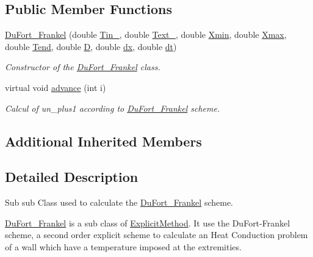 \subsection*{Public Member Functions}
\begin{DoxyCompactItemize}
\item 
\hyperlink{class_du_fort___frankel_a5076e52da09f994da1542d71a56781df}{Du\+Fort\+\_\+\+Frankel} (double \hyperlink{class_heat_conduction_a2487010bf67582643ff59c0c5167725e}{Tin\+\_}, double \hyperlink{class_heat_conduction_aeb50fb3189fd6545f765ef73c9be7889}{Text\+\_}, double \hyperlink{class_heat_conduction_a6ccf374e13ab91b2403db617c9e7a8f0}{Xmin}, double \hyperlink{class_heat_conduction_a187dd05134300536dd9b5418e2957e9a}{Xmax}, double \hyperlink{class_heat_conduction_ab1d00caf79f4c04b420189eaf7c666e1}{Tend}, double \hyperlink{class_heat_conduction_a197d8aa3aa8619edaa640c243bdfc793}{D}, double \hyperlink{class_heat_conduction_a208bf1f475147b07a1f7d28533d78d9c}{dx}, double \hyperlink{class_heat_conduction_a7a7d5f6631039781c80b8c0c60e540e6}{dt})
\begin{DoxyCompactList}\small\item\em Constructor of the \hyperlink{class_du_fort___frankel}{Du\+Fort\+\_\+\+Frankel} class. \end{DoxyCompactList}\item 
virtual void \hyperlink{class_du_fort___frankel_ae8a6c6c56b2a4ce3bf7f80075a2cf680}{advance} (int i)
\begin{DoxyCompactList}\small\item\em Calcul of un\+\_\+plus1 according to \hyperlink{class_du_fort___frankel}{Du\+Fort\+\_\+\+Frankel} scheme. \end{DoxyCompactList}\end{DoxyCompactItemize}
\subsection*{Additional Inherited Members}


\subsection{Detailed Description}
Sub sub Class used to calculate the \hyperlink{class_du_fort___frankel}{Du\+Fort\+\_\+\+Frankel} scheme. 

\hyperlink{class_du_fort___frankel}{Du\+Fort\+\_\+\+Frankel} is a sub class of \hyperlink{class_explicit_method}{Explicit\+Method}. It use the Du\+Fort-\/\+Frankel scheme, a second order explicit scheme to calculate an Heat Conduction problem of a wall which have a temperature imposed at the extremities. 

